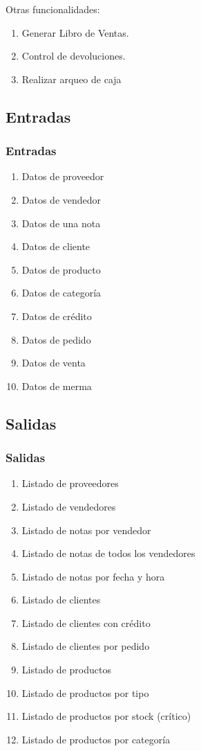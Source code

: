 \documentclass{beamer}
\begin{document}
\begin{frame}
Otras funcionalidades: 
\begin{enumerate}
\item Generar Libro de Ventas.
\item Control de devoluciones. 
\item Realizar arqueo de caja
\end{enumerate}
\end{frame}

\subsection{Entradas}

\begin{frame}
\frametitle{Entradas}
\begin{enumerate}
\item Datos de proveedor
\item Datos de vendedor
\item Datos de una nota
\item Datos de cliente
\item Datos de producto
\item Datos de categoría
\item Datos de crédito
\item Datos de pedido
\item Datos de venta
\item Datos de merma
\end{enumerate}
\end{frame}

\subsection{Salidas}

\begin{frame}
\frametitle{Salidas}
\begin{enumerate}
\item Listado de proveedores
\item Listado de vendedores
\item Listado de notas por vendedor
\item Listado de notas de todos los vendedores
\item Listado de notas por fecha y hora 
\item Listado de clientes 
\item Listado de clientes con crédito 
\item Listado de clientes por pedido 
\item Listado de productos 
\item Listado de productos por tipo 
\item Listado de productos por stock (crítico) 
\item Listado de productos por categoría
\end{enumerate}
\end{frame}
\end{document}
